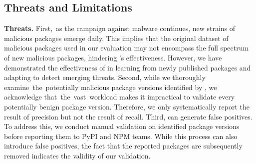 
\subsection{Threats and Limitations}

\textbf{Threats.} First,~as the campaign against malware continues, new strains of malicious packages emerge daily. This implies that the original dataset of malicious packages used in our evaluation may not encompass the full spectrum of new malicious packages, hindering \tool's effectiveness. However, we have demonstrated the effectiveness of \tool in learning from newly published packages and adapting to detect emerging threats. Second, while we thoroughly examine~the~potentially malicious package versions identified by \tool, we acknowledge that~the~vast~workload makes it impractical to validate every potentially benign package version. Therefore, we only systematically report the result of precision but not the result of recall. Third, \tool can generate false positives. To address this, we conduct manual validation on identified package versions before reporting them to PyPI and NPM teams. While this process can also introduce false positives, the fact that the reported packages are subsequently removed indicates the validity of our validation. 




